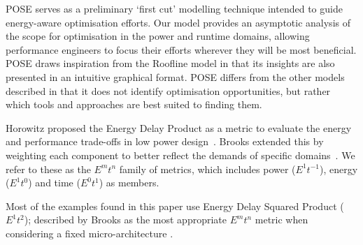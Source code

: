 POSE serves as a preliminary `first cut' modelling technique intended to guide energy-aware optimisation efforts.
Our model provides an asymptotic analysis of the scope for optimisation in the power and runtime domains, allowing performance engineers to focus their efforts wherever they will be most beneficial.
POSE draws inspiration from the Roofline model in that its insights are also presented in an intuitive graphical format.
POSE differs from the other models described in that it does not identify optimisation opportunities, but rather which tools and approaches are best suited to finding them.  


Horowitz proposed the Energy Delay Product as a metric to evaluate the energy and performance trade-offs in low power design~\cite{horowitz:1994aa}.
Brooks extended this by weighting each component to better reflect the demands of specific domains~\cite{brooks:2000ab}.
We refer to these as the $E^mt^n$ family of metrics, which includes power ($E^1t^{-1}$), energy ($E^1t^0$) and time ($E^0t^1$) as members.

Most of the examples found in this paper use Energy Delay Squared Product ($E^1t^2$); described by Brooks as the most appropriate $E^mt^n$ metric when considering a fixed micro-architecture \cite{brooks:2000aa}.
